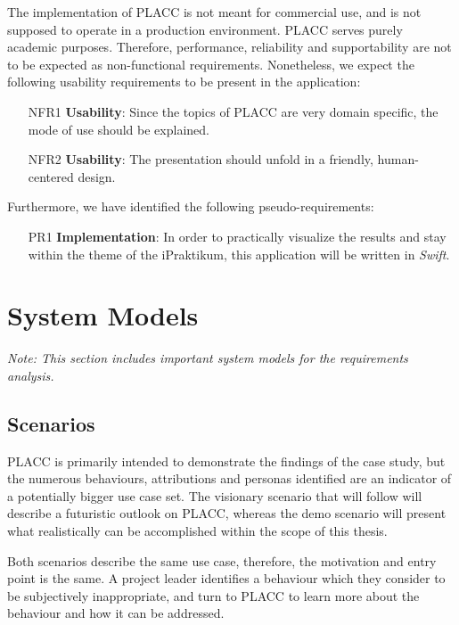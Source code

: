The implementation of PLACC is not meant for commercial use, and is not supposed to operate in a production environment. PLACC serves purely academic purposes. Therefore, performance, reliability and supportability are not to be expected as non-functional requirements. Nonetheless, we expect the following usability requirements to be present in the application:

\begin{itemize}
\item [NFR1] \textbf{Usability}: Since the topics of PLACC are very domain specific, the mode of use should be explained.
\item [NFR2] \textbf{Usability}: The presentation should unfold in a friendly, human-centered design.
\end{itemize}

Furthermore, we have identified the following pseudo-requirements:

\begin{itemize}
\item [PR1] \textbf{Implementation}: In order to practically visualize the results and stay within the theme of the iPraktikum, this application will be written in \textit{Swift}.
\end{itemize}

\section{System Models} \label{SystemModels}

\textit{Note: This section includes important system models for the requirements analysis.}

\subsection{Scenarios}


PLACC is primarily intended to demonstrate the findings of the case study, but the numerous behaviours, attributions and personas identified are an indicator of a potentially bigger use case set. The visionary scenario that will follow will describe a futuristic outlook on PLACC, whereas the demo scenario will present what realistically can be accomplished within the scope of this thesis.

Both scenarios describe the same use case, therefore, the motivation and entry point is the same. A project leader identifies a behaviour which they consider to be subjectively inappropriate, and turn to PLACC to learn more about the behaviour and how it can be addressed.

